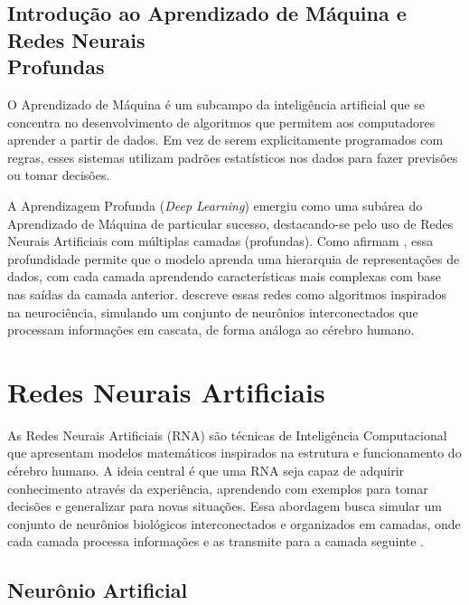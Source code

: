 \subsection[Introdução ao Aprendizado de Máquina e Redes Neurais Profundas]{Introdução ao Aprendizado de Máquina e Redes Neurais\\Profundas}

O Aprendizado de Máquina é um subcampo da inteligência artificial que se concentra no
desenvolvimento de algoritmos que permitem aos computadores aprender a partir de dados. Em vez
de serem explicitamente programados com regras, esses sistemas utilizam padrões estatísticos
nos dados para fazer previsões ou tomar decisões.

A Aprendizagem Profunda (\textit{Deep Learning}) emergiu como uma subárea do Aprendizado de
Máquina de particular sucesso, destacando-se pelo uso de Redes Neurais Artificiais com múltiplas
camadas (profundas). Como afirmam , essa profundidade permite que
o modelo aprenda uma hierarquia de representações de dados, com cada camada aprendendo
características mais complexas com base nas saídas da camada anterior.
 descreve essas redes como algoritmos inspirados na neurociência,
simulando um conjunto de neurônios interconectados que processam informações em cascata, de
forma análoga ao cérebro humano.

\section{Redes Neurais Artificiais}

As Redes Neurais Artificiais (RNA) são técnicas de Inteligência Computacional que apresentam
modelos matemáticos inspirados na estrutura e funcionamento do cérebro humano. A ideia central
é que uma RNA seja capaz de adquirir conhecimento através da experiência, aprendendo com
exemplos para tomar decisões e generalizar para novas situações. Essa abordagem busca simular
um conjunto de neurônios biológicos interconectados e organizados em camadas, onde cada camada
processa informações e as transmite para a camada seguinte \cite{andrade2011redes}.

\subsection{Neurônio Artificial}

